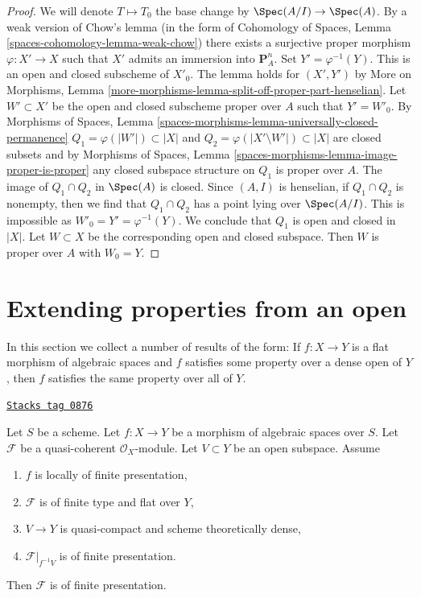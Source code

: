 \begin{proof}
We will denote $T \mapsto T_0$ the base change by
$\Spec(A/I) \to \Spec(A)$.
By a weak version of Chow's lemma (in the form of
Cohomology of Spaces, Lemma \ref{spaces-cohomology-lemma-weak-chow})
there exists a surjective proper morphism $\varphi : X' \to X$ such
that $X'$ admits an immersion into $\mathbf{P}^n_A$.
Set $Y' = \varphi^{-1}(Y)$. This is an open and closed subscheme
of $X'_0$. The lemma holds for $(X', Y')$ by
More on Morphisms, Lemma
\ref{more-morphisms-lemma-split-off-proper-part-henselian}.
Let $W' \subset X'$ be the open and closed subscheme proper
over $A$ such that $Y' = W'_0$.
By Morphisms of Spaces, Lemma
\ref{spaces-morphisms-lemma-universally-closed-permanence}
$Q_1 = \varphi(|W'|) \subset |X|$ and
$Q_2 = \varphi(|X' \setminus W'|) \subset |X|$
are closed subsets and by
Morphisms of Spaces, Lemma \ref{spaces-morphisms-lemma-image-proper-is-proper}
any closed subspace structure on $Q_1$ is proper over $A$.
The image of $Q_1 \cap Q_2$ in $\Spec(A)$ is closed.
Since $(A, I)$ is henselian, if $Q_1 \cap Q_2$ is nonempty, then we
find that $Q_1 \cap Q_2$ has a point lying over $\Spec(A/I)$.
This is impossible as $W'_0 = Y' = \varphi^{-1}(Y)$.
We conclude that $Q_1$ is open and closed in $|X|$.
Let $W \subset X$ be the corresponding open and closed
subspace. Then $W$ is proper over $A$ with $W_0 = Y$.
\end{proof}

\section{Extending properties from an open}
\label{spaces-more-morphisms-section-extending-properties}
In this section we collect a number of results of the form: If $f : X \to Y$
is a flat morphism of algebraic spaces and $f$ satisfies some property over
a dense
open of $Y$, then $f$ satisfies the same property over all of $Y$.

\begin{lemma}
\label{spaces-more-morphisms-lemma-flat-finite-type-finitely-presented-over-dense-open}
\href{https://stacks.math.columbia.edu/tag/0876}{\texttt{Stacks tag 0876}}

Let $S$ be a scheme.
Let $f : X \to Y$ be a morphism of algebraic spaces over $S$.
Let $\mathcal{F}$ be a quasi-coherent $\mathcal{O}_X$-module.
Let $V \subset Y$ be an open subspace. Assume
\begin{enumerate}
\item $f$ is locally of finite presentation,
\item $\mathcal{F}$ is of finite type and flat over $Y$,
\item $V \to Y$ is quasi-compact and scheme theoretically dense,
\item $\mathcal{F}|_{f^{-1}V}$ is of finite presentation.
\end{enumerate}
Then $\mathcal{F}$ is of finite presentation.
\end{lemma}

